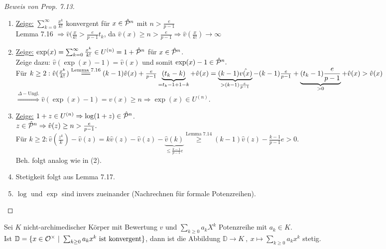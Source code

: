 \begin{proof}[Beweis von Prop. 7.13]
\begin{enumerate}[(1)]
\item \underline{Zeige:} $\sum_{k=0}^\infty \frac{x^k}{k!}$ konvergent für $x \in \hat{\mathcal{P}}^n$ mit $n>\frac{e}{p-1}$\\
Lemma 7.16 $\Rightarrow \hat{v}(\frac{x}{k!}>\frac{e}{p-1}t_k$, da $\hat{v}(x) \geq n > \frac{e}{p-1} \Rightarrow \hat{v}(\frac{x}{k!}) \to \infty$
\item \underline{Zeige:} $\exp(x)=\sum_{k=0}^\infty \frac{x^k}{k!} \in U^{(n)} = 1+\hat{\mathcal{P}}^n$ für $x \in \hat{\mathcal{P}}^n$.\\
Zeige dazu: $\hat{v}(\exp(x)-1)=\hat{v}(x)$ und somit $\exp(x)-1 \in \hat{\mathcal{P}}^n.$\\
Für $k\geq 2: \hat{v}(\frac{x^k}{k!}) \stackrel{\text{Lemma 7.16}}{=\joinrel =} (k-1) \hat{v}(x)+\frac{e}{p-1}\underbrace{(t_k-k)}_{=t_k-1+1-k}+\hat{v}(x)\\
=\underbrace{(k-1)\hat{v(x)}}_{>(k-1)\frac{e}{p-1}}-(k-1)\frac{e}{p-1}+ \underbrace{(t_k-1)\frac{e}{p-1}}_{>0} + \hat{v}(x)>\hat{v}(x)$\\
$\stackrel{\Delta-\text{Ungl.}}{\Rightarrow} \hat{v}(\exp(x)-1)=\hat{v}(x) \geq n \Rightarrow \exp(x) \in U^{(n)}.$
\item \underline{Zeige:} $1+z\in U^{(n)} \Rightarrow \log(1+z)\in \hat{\mathcal{P}}^n$.\\
$z\in \hat{\mathcal{P}}^n \Rightarrow \hat{v}(z) \geq n > \frac{e}{p-1}.$\\
Für $k \geq 2: \hat{v}(\frac{z^k}{k})-\hat{v}(z) = k \hat{v}(z) - \hat{v}(z) - \underbrace{\hat{v}(k)}_{\leq \frac{k-1}{p-1}e} \stackrel{\text{Lemma 7.14}}{\geq} (k-1)\hat{v}(z) - \frac{k-1}{p-1}e >0$.\\
Beh. folgt analog wie in (2).
\item Stetigkeit folgt aus Lemma 7.17.
\item $\log$ und $\exp$ sind invers zueinander (Nachrechnen für formale Potenzreihen).
\end{enumerate}
\end{proof}

\begin{Lem}
Sei $K$ nicht-archimedischer Körper mit Bewertung $v$ und $\sum_{k \geq 0} a_k X^k$ Potenzreihe mit $a_k \in K$.\\
Ist $\mathbb{D}=\{x \in \O^\times \ | \ \sum_{k \geq 0} a_k x^k \text{ ist konvergent} \}$, dann ist die Abbildung $\mathbb{D} \to K \ , \ x \mapsto \sum_{k\geq 0} a_k x^k$ stetig.
\end{Lem}

